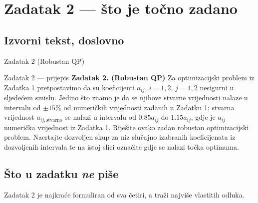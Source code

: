 \chapter{Zadatak 2 --- što je točno zadano}
\label{ch:z2-zadatak}

\section{Izvorni tekst, doslovno}
\label{sec:z2-izvorni}

\begin{zadatak}{Zadatak 2 (Robustan QP)}
\end{zadatak}

\begin{zadatak}{Zadatak 2 --- prijepis}
\textbf{Zadatak 2. (Robustan QP)} Za optimizacijski problem iz Zadatka 1
pretpostavimo da su koeficijenti $a_{ij}$, $i = 1,2$, $j = 1,2$ nesigurni u
sljedećem smislu. Jedino što znamo je da se njihove stvarne vrijednosti nalaze u
intervalu od $\pm 15\%$ od numeričkih vrijednosti zadanih u Zadatku 1: stvarna
vrijednost $a_{ij,\text{stvarno}}$ se nalazi u intervalu od $0.85 a_{ij}$ do
$1.15 a_{ij}$, gdje je $a_{ij}$ numerička vrijednost iz Zadatka 1. Riješite ovako
zadan robustan optimizacijski problem. Nacrtajte dozvoljen skup za niz slučajno
izabranih koeficijenata iz dozvoljenih intervala te na istoj slici označite gdje
se nalazi točka optimuma.
\end{zadatak}

\section{Što u zadatku \emph{ne} piše}
\label{sec:z2-nije-receno}

Zadatak 2 je najkraće formuliran od sva četiri, a traži najviše vlastitih odluka.

